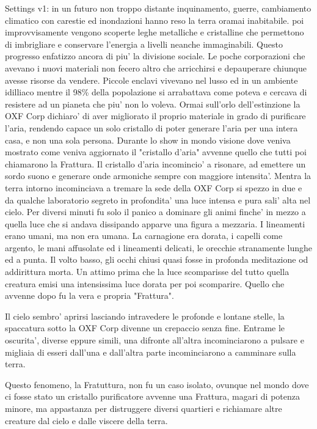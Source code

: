 \documentclass[12pt,a4paper,twoside,openany]{book}
\begin{document}
Settings v1:  in un futuro non troppo distante inquinamento, guerre, cambiamento climatico con carestie ed inondazioni hanno reso la terra oramai inabitabile. poi improvvisamente vengono scoperte leghe metalliche e cristalline che permettono di imbrigliare e conservare l'energia a livelli neanche immaginabili.
Questo progresso enfatizzo ancora di piu' la divisione sociale. Le poche corporazioni che avevano i nuovi materiali non fecero altro che arricchirsi e depauperare chiunque avesse risorse da vendere.
Piccole enclavi vivevano nel lusso ed in un ambiente idilliaco mentre il 98\% della popolazione si arrabattava come poteva e cercava di resistere ad un pianeta che piu' non lo voleva.
Ormai sull'orlo dell'estinzione la OXF Corp dichiaro' di aver migliorato il proprio materiale in grado di purificare l'aria, rendendo capace un solo cristallo di poter generare l'aria per una intera casa, e non una sola persona.
Durante lo show in mondo visione dove veniva mostrato come veniva aggiornato il "cristallo d'aria" avvenne quello che tutti poi chiamarono la Frattura. 
Il cristallo d'aria incomincio' a risonare, ad emettere un sordo suono e generare onde armoniche sempre con maggiore intensita'. Mentra la terra intorno incominciava a tremare la sede della OXF Corp si spezzo in due e da qualche laboratorio segreto in profondita' una luce intensa e pura sali' alta nel cielo. Per diversi minuti fu solo il panico a dominare gli animi finche' in mezzo a quella luce che si andava dissipando apparve una figura a mezzaria. I lineamenti erano umani, ma non era umana. La carnagione era dorata, i capelli come argento, le mani affusolate ed i lineamenti delicati, le orecchie stranamente lunghe ed a punta.
Il volto basso, gli occhi chiusi quasi fosse in profonda meditazione od addirittura morta.
Un attimo prima che la luce scomparisse del tutto quella creatura emisi una intensissima luce dorata per poi scomparire.
Quello che avvenne dopo fu la vera e propria "Frattura".

Il cielo sembro' aprirsi lasciando intravedere le profonde e lontane stelle, la spaccatura sotto la OXF Corp divenne un crepaccio senza fine.
Entrame le oscurita', diverse eppure simili, una difronte all'altra incominciarono a pulsare e migliaia di esseri dall'una e dall'altra parte incominciarono a camminare sulla terra.

Questo fenomeno, la Fratuttura, non fu un caso isolato, ovunque nel mondo dove ci fosse stato un cristallo purificatore avvenne una Frattura, magari di potenza minore, ma appastanza per distruggere diversi quartieri e richiamare altre creature dal cielo e dalle viscere della terra.
\end{document}
